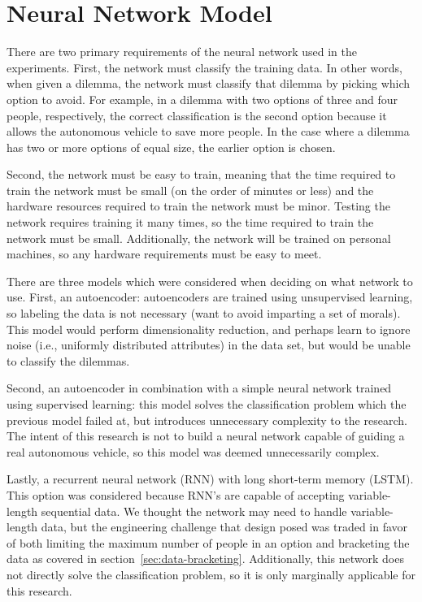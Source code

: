\documentclass[]{report}
\begin{document}
\FloatBarrier
\section{Neural Network Model}

There are two primary requirements of the neural network used in the experiments. First, the network
must classify the training data. In other words, when given a dilemma, the network must classify
that dilemma by picking which option to avoid. For example, in a dilemma with two options of three
and four people, respectively, the correct classification is the second option because it allows the
autonomous vehicle to save more people. In the case where a dilemma has two or more options of equal
size, the earlier option is chosen.

Second, the network must be easy to train, meaning that the time required to train the network must
be small (on the order of minutes or less) and the hardware resources required to train the network
must be minor. Testing the network requires training it many times, so the time required to train
the network must be small. Additionally, the network will be trained on personal machines, so any
hardware requirements must be easy to meet.

There are three models which were considered when deciding on what network to use. First, an
autoencoder: autoencoders are trained using unsupervised learning, so labeling the data is not
necessary (want to avoid imparting a set of morals). This model would perform dimensionality
reduction, and perhaps learn to ignore noise (i.e., uniformly distributed attributes) in the data
set, but would be unable to classify the dilemmas.

Second, an autoencoder in combination with a simple neural network trained using supervised
learning: this model solves the classification problem which the previous model failed at, but
introduces unnecessary complexity to the research. The intent of this research is not to build a
neural network capable of guiding a real autonomous vehicle, so this model was deemed unnecessarily
complex.

Lastly, a recurrent neural network (RNN) with long short-term memory (LSTM). This option was
considered because RNN's are capable of accepting variable-length sequential data. We thought the
network may need to handle variable-length data, but the engineering challenge that design posed was
traded in favor of both limiting the maximum number of people in an option and bracketing the data
as covered in section~\ref{sec:data-bracketing}. Additionally, this network does not directly solve
the classification problem, so it is only marginally applicable for this research.
\end{document}
